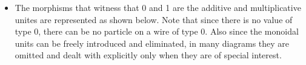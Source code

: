 \documentclass[preprint]{sigplanconf}
\begin{document}
\begin{itemize}
\item The morphisms that witness that {{0}} and {{1}} are the additive and
  multiplicative unites are represented as shown below. Note that since there
  is no value of type 0, there can be no particle on a wire of type {{0}}.
  Also since the monoidal units can be freely introduced and eliminated, in
  many diagrams they are omitted and dealt with explicitly only when they are
  of special interest.
\begin{multicols}{2}
\begin{center}
\end{center}
\begin{center}
\end{center}  
\end{multicols}
\begin{multicols}{2}
\begin{center}
\end{center}
\columnbreak
\begin{center}
\end{center}
\end{multicols}


\end{itemize}
\end{document}
